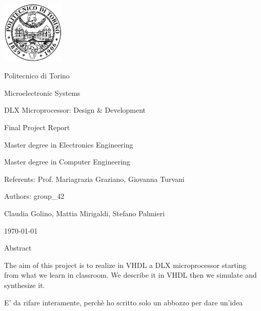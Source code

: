 \documentclass[10pt,  english, makeidx, a4paper, titlepage, oneside]{book}
\begin{document}
\frontmatter
\begin{titlepage}
\vspace{0cm}
\centerline{
\includegraphics[width=3cm]{./logopoli}} 
\vspace{0.5cm}
\centerline{\LARGE Politecnico di Torino}
\vspace{2.5cm}
\centerline{\huge\sf Microelectronic Systems}
\vspace{1cm}
\centerline{\Huge\sf DLX Microprocessor: Design \& Development}
\bigskip
\centerline{\huge\sf Final Project Report}
\vspace{2cm}
\centerline{\Large Master degree in Electronics Engineering}
\bigskip
\centerline{\Large Master degree in Computer Engineering}
\vspace{4.5cm}
\centerline{\large Referents: Prof. Mariagrazia Graziano, Giovanna Turvani}
\bigskip
\vspace{1cm}
%
%
\centerline{\large Authors: group\_42}
\bigskip
%
%
\centerline{\large Claudia Golino, Mattia Mirigaldi, Stefano Palmieri}
%
\vspace{2cm}
\centerline{\large \today}
\end{titlepage}

\centerline{\Large Abstract}
\bigskip

The aim of this project is to realize in VHDL a  DLX microprocessor starting from what we learn in classroom. We describe it in VHDL then we simulate and synthesize it.


E' da rifare interamente, perchè ho scritto solo un abbozzo per dare un'idea

\tableofcontents
\mainmatter
%    
%






% 
%
%    
%
\appendix


% 
%
\end{document}
